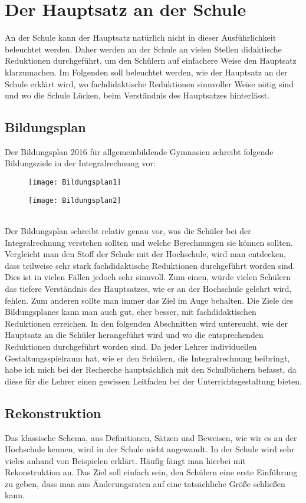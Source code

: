 \documentclass[a4paper]{article}
\begin{document}
\section{Der Hauptsatz an der Schule}
An der Schule kann der Hauptsatz natürlich nicht in dieser Ausführlichkeit beleuchtet werden. Daher werden an der Schule an vielen Stellen didaktische Reduktionen durchgeführt, um den Schülern auf einfachere Weise den Hauptsatz klarzumachen. Im Folgenden soll beleuchtet werden, wie der Hauptsatz an der Schule erklärt wird, wo fachdidaktische Reduktionen sinnvoller Weise nötig sind und wo die Schule Lücken, beim Verständnis des Hauptsatzes hinterlässt.
\subsection{Bildungsplan}
Der Bildungsplan 2016 für allgemeinbildende Gymnasien schreibt folgende Bildungsziele in der Integralrechnung vor: 
\vspace{1em} \\
\begin{figure}[h!]
\centering
\texttt{[image: Bildungsplan1]}
\end{figure}
\begin{figure}[h!]
\centering
\texttt{[image: Bildungsplan2]}
\end{figure} 
\vspace{1em}\\
Der Bildungsplan schreibt relativ genau vor, was die Schüler bei der Integralrechnung verstehen sollten und welche Berechnungen sie können sollten. Vergleicht man den Stoff der Schule mit der Hochschule, wird man entdecken, dass teilweise sehr stark fachdidaktische Reduktionen durchgeführt worden sind. Dies ist in vielen Fällen jedoch sehr sinnvoll. Zum einen, würde vielen Schülern das tiefere Verständnis des Hauptsatzes, wie er an der Hochschule gelehrt wird, fehlen. Zum anderen sollte man immer das Ziel im Auge behalten. Die Ziele des Bildungsplanes kann man auch gut, eher besser, mit fachdidaktischen Reduktionen erreichen. In den folgenden Abschnitten wird untersucht, wie der Hauptsatz an die Schüler herangeführt wird und wo die entsprechenden Reduktionen durchgeführt worden sind. Da jeder Lehrer individuellen Gestaltungsspielraum hat, wie er den Schülern, die Integralrechnung beibringt, habe ich mich bei der Recherche hauptsächlich mit den Schulbüchern befasst, da diese für die Lehrer einen gewissen Leitfaden bei der Unterrichtsgestaltung bieten. 
\subsection{Rekonstruktion}
Das klassische Schema, aus Definitionen, Sätzen und Beweisen, wie wir es an der Hochschule kennen, wird in der Schule nicht angewandt. In der Schule wird sehr vieles anhand von Beispielen erklärt. Häufig fängt man hierbei mit Rekonstruktion an. Das Ziel soll einfach sein, den Schülern eine erste Einführung zu geben, dass man aus Änderungsraten auf eine tatsächliche Größe schließen kann. 
\end{document}
